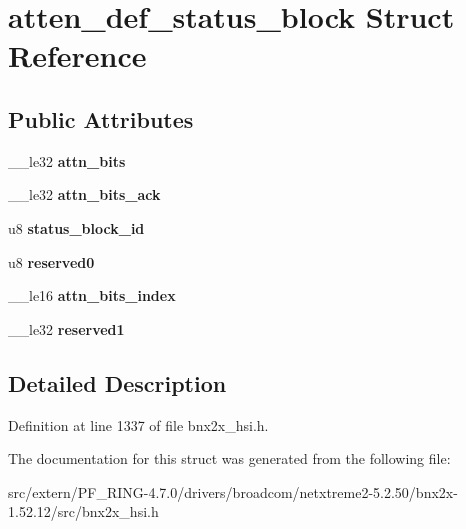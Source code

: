\hypertarget{structatten__def__status__block}{
\section{atten\_\-def\_\-status\_\-block Struct Reference}
\label{structatten__def__status__block}
}
\subsection*{Public Attributes}
\begin{DoxyCompactItemize}
\item 
\hypertarget{structatten__def__status__block_af7c1bf934bd868e4c92d78427bfef45e}{
\_\-\_\-le32 {\bfseries attn\_\-bits}}
\label{structatten__def__status__block_af7c1bf934bd868e4c92d78427bfef45e}

\item 
\hypertarget{structatten__def__status__block_afb2418bb82c345f27f3bbc0adce23cb0}{
\_\-\_\-le32 {\bfseries attn\_\-bits\_\-ack}}
\label{structatten__def__status__block_afb2418bb82c345f27f3bbc0adce23cb0}

\item 
\hypertarget{structatten__def__status__block_a6191466c3dfa2ad3b5f1bf0b56b56cd1}{
u8 {\bfseries status\_\-block\_\-id}}
\label{structatten__def__status__block_a6191466c3dfa2ad3b5f1bf0b56b56cd1}

\item 
\hypertarget{structatten__def__status__block_a56ec3c1911174c0a9bbe62284597915e}{
u8 {\bfseries reserved0}}
\label{structatten__def__status__block_a56ec3c1911174c0a9bbe62284597915e}

\item 
\hypertarget{structatten__def__status__block_a19a51615b870f8e55a76439e6aaaaa59}{
\_\-\_\-le16 {\bfseries attn\_\-bits\_\-index}}
\label{structatten__def__status__block_a19a51615b870f8e55a76439e6aaaaa59}

\item 
\hypertarget{structatten__def__status__block_adb8b99352a6680f40096da0916c92a77}{
\_\-\_\-le32 {\bfseries reserved1}}
\label{structatten__def__status__block_adb8b99352a6680f40096da0916c92a77}

\end{DoxyCompactItemize}


\subsection{Detailed Description}


Definition at line 1337 of file bnx2x\_\-hsi.h.



The documentation for this struct was generated from the following file:\begin{DoxyCompactItemize}
\item 
src/extern/PF\_\-RING-\/4.7.0/drivers/broadcom/netxtreme2-\/5.2.50/bnx2x-\/1.52.12/src/bnx2x\_\-hsi.h\end{DoxyCompactItemize}
